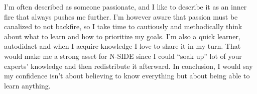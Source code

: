 \documentclass[11pt, a4paper]{awesome-cv}
\begin{document}
\begin{cvletter}
I'm often described as someone passionate, and I like to describe it as an inner fire that always pushes me further. I'm however aware that passion must be canalized to not backfire, so I take time to cautiously and methodically think about what to learn and how to prioritize my goals. I'm also a quick learner, autodidact and when I acquire knowledge I love to share it in my turn. That would make me a strong asset for N-SIDE since I could ``soak up'' lot of your experts' knowledge and then redistribute it afterward. In conclusion, I would say my confidence isn't about believing to know everything but about being able to learn anything.

\end{cvletter}


\makeletterclosing
\end{document}
